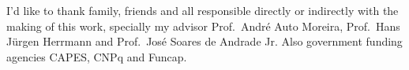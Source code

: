 \begin{agradecimentos}

    I'd like to thank family, friends and all responsible directly or
    indirectly with the making of this work, specially my advisor Prof.\ André
    Auto Moreira, Prof.\ Hans Jürgen Herrmann and Prof.\ José Soares de Andrade
    Jr. Also government funding agencies CAPES, CNPq and Funcap.

\end{agradecimentos}

